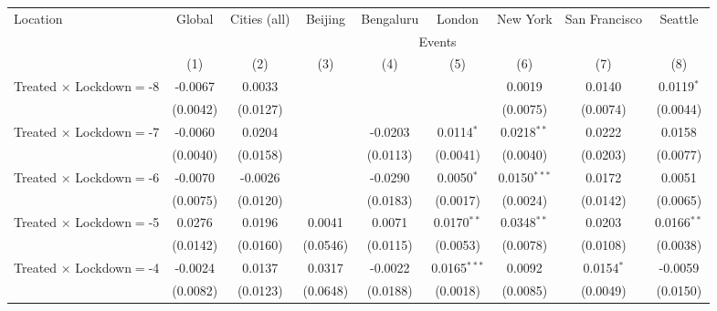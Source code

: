 
\begin{tabular}{lcccccccc}
   \toprule
   Location & Global & Cities (all) & Beijing & Bengaluru & London & New York & San Francisco & Seattle \\ \cmidrule(lr){2-2} \cmidrule(lr){3-3} \cmidrule(lr){4-4} \cmidrule(lr){5-5} \cmidrule(lr){6-6} \cmidrule(lr){7-7} \cmidrule(lr){8-8} \cmidrule(lr){9-9}
    & \multicolumn{8}{c}{Events}\\
                                   & (1)            & (2)            & (3)           & (4)            & (5)            & (6)            & (7)            & (8)\\
   \midrule 
   Treated $\times$ Lockdown$=$-8 & -0.0067        & 0.0033         &               &                &                & 0.0019         & 0.0140         & 0.0119$^{*}$\\
                                   & (0.0042)       & (0.0127)       &               &                &                & (0.0075)       & (0.0074)       & (0.0044)\\
   Treated $\times$ Lockdown$=$-7 & -0.0060        & 0.0204         &               & -0.0203        & 0.0114$^{*}$   & 0.0218$^{**}$  & 0.0222         & 0.0158\\
                                   & (0.0040)       & (0.0158)       &               & (0.0113)       & (0.0041)       & (0.0040)       & (0.0203)       & (0.0077)\\
   Treated $\times$ Lockdown$=$-6 & -0.0070        & -0.0026        &               & -0.0290        & 0.0050$^{*}$   & 0.0150$^{***}$ & 0.0172         & 0.0051\\
                                   & (0.0075)       & (0.0120)       &               & (0.0183)       & (0.0017)       & (0.0024)       & (0.0142)       & (0.0065)\\
   Treated $\times$ Lockdown$=$-5 & 0.0276         & 0.0196         & 0.0041        & 0.0071         & 0.0170$^{**}$  & 0.0348$^{**}$  & 0.0203         & 0.0166$^{**}$\\
                                   & (0.0142)       & (0.0160)       & (0.0546)      & (0.0115)       & (0.0053)       & (0.0078)       & (0.0108)       & (0.0038)\\
   Treated $\times$ Lockdown$=$-4 & -0.0024        & 0.0137         & 0.0317        & -0.0022        & 0.0165$^{***}$ & 0.0092         & 0.0154$^{*}$   & -0.0059\\
                                   & (0.0082)       & (0.0123)       & (0.0648)      & (0.0188)       & (0.0018)       & (0.0085)       & (0.0049)       & (0.0150)\\

\end{tabular}

